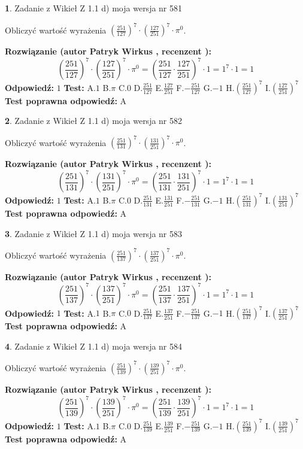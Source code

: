 \documentclass[12pt, a4paper]{article}
\theoremstyle{definition} %
\newtheorem{zad}{}
\newcommand{\zadStart}[1]{\begin{zad}#1\newline}
\newcommand{\zadStop}{\end{zad}}
\newcommand{\rozwStart}[2]{\noindent \textbf{Rozwiązanie (autor #1 , recenzent #2): }\newline}
\newcommand{\rozwStop}{\newline}
\newcommand{\odpStart}{\noindent \textbf{Odpowiedź:}\newline}
\newcommand{\odpStop}{\newline}
\newcommand{\testStart}{\noindent \textbf{Test:}\newline}
\newcommand{\testStop}{\newline}
\newcommand{\kluczStart}{\noindent \textbf{Test poprawna odpowiedź:}\newline}
\newcommand{\kluczStop}{\newline}
\begin{document}
\zadStart{Zadanie z Wikieł Z 1.1 d) moja wersja nr 581}

Obliczyć wartość wyrażenia $(\frac{251}{127})^{7} \cdot (\frac{127}{251})^{7} \cdot \pi^{0}$.
\zadStop
\rozwStart{Patryk Wirkus}{}
$$(\frac{251}{127})^{7} \cdot (\frac{127}{251})^{7} \cdot \pi^{0} = (\frac{251}{127} \cdot \frac{127}{251})^{7} \cdot 1 = 1^{7} \cdot 1 = 1$$
\rozwStop
\odpStart
$1$
\odpStop
\testStart
A.$1$ B.$\pi$ C.$0$ D.$\frac{251}{127}$ E.$\frac{127}{251}$
F.$-\frac{251}{127}$ G.$-1$
H.$(\frac{251}{127})^{7}$
I.$(\frac{127}{251})^{7}$
\testStop
\kluczStart
A
\kluczStop



\zadStart{Zadanie z Wikieł Z 1.1 d) moja wersja nr 582}

Obliczyć wartość wyrażenia $(\frac{251}{131})^{7} \cdot (\frac{131}{251})^{7} \cdot \pi^{0}$.
\zadStop
\rozwStart{Patryk Wirkus}{}
$$(\frac{251}{131})^{7} \cdot (\frac{131}{251})^{7} \cdot \pi^{0} = (\frac{251}{131} \cdot \frac{131}{251})^{7} \cdot 1 = 1^{7} \cdot 1 = 1$$
\rozwStop
\odpStart
$1$
\odpStop
\testStart
A.$1$ B.$\pi$ C.$0$ D.$\frac{251}{131}$ E.$\frac{131}{251}$
F.$-\frac{251}{131}$ G.$-1$
H.$(\frac{251}{131})^{7}$
I.$(\frac{131}{251})^{7}$
\testStop
\kluczStart
A
\kluczStop



\zadStart{Zadanie z Wikieł Z 1.1 d) moja wersja nr 583}

Obliczyć wartość wyrażenia $(\frac{251}{137})^{7} \cdot (\frac{137}{251})^{7} \cdot \pi^{0}$.
\zadStop
\rozwStart{Patryk Wirkus}{}
$$(\frac{251}{137})^{7} \cdot (\frac{137}{251})^{7} \cdot \pi^{0} = (\frac{251}{137} \cdot \frac{137}{251})^{7} \cdot 1 = 1^{7} \cdot 1 = 1$$
\rozwStop
\odpStart
$1$
\odpStop
\testStart
A.$1$ B.$\pi$ C.$0$ D.$\frac{251}{137}$ E.$\frac{137}{251}$
F.$-\frac{251}{137}$ G.$-1$
H.$(\frac{251}{137})^{7}$
I.$(\frac{137}{251})^{7}$
\testStop
\kluczStart
A
\kluczStop



\zadStart{Zadanie z Wikieł Z 1.1 d) moja wersja nr 584}

Obliczyć wartość wyrażenia $(\frac{251}{139})^{7} \cdot (\frac{139}{251})^{7} \cdot \pi^{0}$.
\zadStop
\rozwStart{Patryk Wirkus}{}
$$(\frac{251}{139})^{7} \cdot (\frac{139}{251})^{7} \cdot \pi^{0} = (\frac{251}{139} \cdot \frac{139}{251})^{7} \cdot 1 = 1^{7} \cdot 1 = 1$$
\rozwStop
\odpStart
$1$
\odpStop
\testStart
A.$1$ B.$\pi$ C.$0$ D.$\frac{251}{139}$ E.$\frac{139}{251}$
F.$-\frac{251}{139}$ G.$-1$
H.$(\frac{251}{139})^{7}$
I.$(\frac{139}{251})^{7}$
\testStop
\kluczStart
A
\kluczStop
\end{document}
